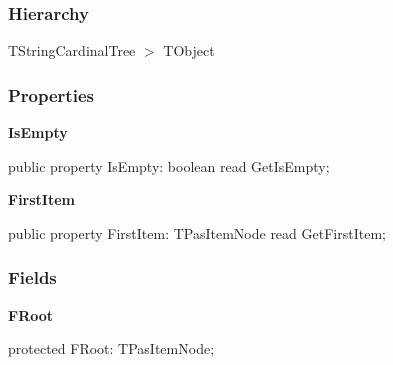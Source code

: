 \documentclass{report}
\newif\ifpdf
\begin{document}
\subsubsection*{\large{\textbf{Hierarchy}}\normalsize\hspace{1ex}\hfill}
TStringCardinalTree {$>$} TObject
\subsubsection*{\large{\textbf{Properties}}\normalsize\hspace{1ex}\hfill}
\begin{list}{}{
\setlength{\itemindent}{0cm}
\setlength{\listparindent}{0cm}
\setlength{\leftmargin}{\evensidemargin}
\addtolength{\leftmargin}{\tmplength}
\settowidth{\labelsep}{X}
\addtolength{\leftmargin}{\labelsep}
\setlength{\labelwidth}{\tmplength}
}
\label{PasDoc_HierarchyTree.TStringCardinalTree-IsEmpty}
\item[\textbf{IsEmpty}\hfill]
\ifpdf
\begin{flushleft}
\fi
\begin{ttfamily}
public property IsEmpty: boolean read GetIsEmpty;\end{ttfamily}

\ifpdf
\end{flushleft}
\fi


\par  \label{PasDoc_HierarchyTree.TStringCardinalTree-FirstItem}
\item[\textbf{FirstItem}\hfill]
\ifpdf
\begin{flushleft}
\fi
\begin{ttfamily}
public property FirstItem: TPasItemNode read GetFirstItem;\end{ttfamily}

\ifpdf
\end{flushleft}
\fi


\par  \end{list}
\subsubsection*{\large{\textbf{Fields}}\normalsize\hspace{1ex}\hfill}
\begin{list}{}{
\setlength{\itemindent}{0cm}
\setlength{\listparindent}{0cm}
\setlength{\leftmargin}{\evensidemargin}
\addtolength{\leftmargin}{\tmplength}
\settowidth{\labelsep}{X}
\addtolength{\leftmargin}{\labelsep}
\setlength{\labelwidth}{\tmplength}
}
\label{PasDoc_HierarchyTree.TStringCardinalTree-FRoot}
\item[\textbf{FRoot}\hfill]
\ifpdf
\begin{flushleft}
\fi
\begin{ttfamily}
protected FRoot: TPasItemNode;\end{ttfamily}

\ifpdf
\end{flushleft}
\fi


\par  \end{list}
\end{document}
